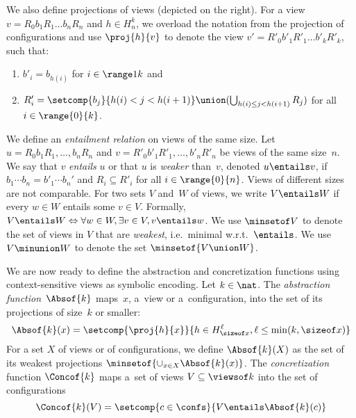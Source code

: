 \begin{wrapfigure}[5]{r}{0.36\textwidth}
  \vspace{-1em}
  \hfill%
\end{wrapfigure}
%
We also define projections of views (depicted on the right).
% 
For a view \mbox{$v=R_0b_1R_1\ldots b_nR_n$} and %
\mbox{$h\in H_n^k$}, we overload the notation from the projection of
configurations and use $\proj{h}{v}$ to denote the view %
\mbox{$v'=R'_0b'_1R'_1\ldots b'_kR'_k$}, such that: %
\begin{enumerate}[label={(\roman{*})}]
\item $b'_i=b_{h(i)}$ for $i\in\range 1 k$ and 
\item $R'_i=\setcomp{b_j}{h(i)<j<h(i+1)}\union(\bigcup_{h(i)\leq
    j<h(i+1)}R_j)$ for all $i\in\range{0}{k}$.
\end{enumerate}

\smallskip%
%
We define an \emph{entailment relation} on views of the same size. %
%
Let $u=R_0b_1R_1,\ldots,b_nR_n$ and $v=R'_0b'_1R'_1,\ldots,b'_nR'_n$
be views of the same size~$n$. %
We say that $v$ \emph{entails} $u$ or that $u$ is \emph{weaker}
than~$v$, denoted $u\entails v$, if $b_1\cdots b_n =b'_1\cdots b_n'$
and $R_i\subseteq R'_i$ for all $i\in\range{0}{n}$. %
%
Views of different sizes are not comparable.
% 
For two sets $V$ and~$W$ of views, we write $V\entails W$ if every
$w\in W$ entails some $v\in V$. Formally, $V\entails W \Leftrightarrow
\forall w\in W, \exists v\in V, v\entails w$.
%
We use $\minsetof V$ to denote the set of views in $V$ that are
\emph{weakest}, i.e.\ minimal w.r.t.~$\entails$.
%
We use $V\minunion W$ to denote the set $\minsetof{V\union W}$.

%
We are now ready to define the abstraction and concretization
functions using context-sensitive views as symbolic encoding.
%
Let $k\in\nat$. %
%
The \emph{abstraction function}~$\Absof{k}$ maps~$x$, a~view or
a~configuration, into the set of its projections of size~$k$ or
smaller:
%
$$
\Absof{k}(x) = \setcomp{\proj{h}{x}}{h\in H_{\sizeof x}^\ell,\ell\leq
  \min(k,\sizeof x)}
$$
% 
For a set $X$ of views or of configurations, we define $\Absof{k}(X)$
as the set of its weakest projections %
$\minsetof{\cup_{x\in X}\Absof{k}(x)}$.
%
%
The \emph{concretization} function $\Concof{k}$ maps a~set of views
$V\subseteq\viewsof k$ into the set of configurations %
$$\Concof{k}(V) = \setcomp{c\in\confs}{V\entails\Absof{k}(c)}$$

